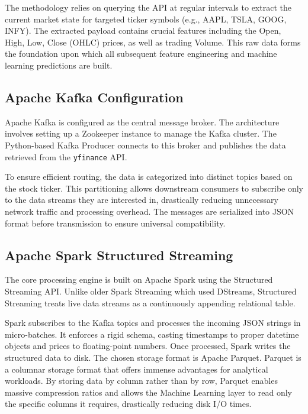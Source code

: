 \documentclass[12pt,a4paper]{report}
\begin{document}
The methodology relies on querying the API at regular intervals to extract the current market state for targeted ticker symbols (e.g., AAPL, TSLA, GOOG, INFY). The extracted payload contains crucial features including the Open, High, Low, Close (OHLC) prices, as well as trading Volume. This raw data forms the foundation upon which all subsequent feature engineering and machine learning predictions are built.

\subsection{Apache Kafka Configuration}

Apache Kafka is configured as the central message broker. The architecture involves setting up a Zookeeper instance to manage the Kafka cluster. The Python-based Kafka Producer connects to this broker and publishes the data retrieved from the \texttt{yfinance} API.

To ensure efficient routing, the data is categorized into distinct topics based on the stock ticker. This partitioning allows downstream consumers to subscribe only to the data streams they are interested in, drastically reducing unnecessary network traffic and processing overhead. The messages are serialized into JSON format before transmission to ensure universal compatibility.

\subsection{Apache Spark Structured Streaming}

The core processing engine is built on Apache Spark using the Structured Streaming API. Unlike older Spark Streaming which used DStreams, Structured Streaming treats live data streams as a continuously appending relational table.

Spark subscribes to the Kafka topics and processes the incoming JSON strings in micro-batches. It enforces a rigid schema, casting timestamps to proper datetime objects and prices to floating-point numbers. Once processed, Spark writes the structured data to disk. The chosen storage format is Apache Parquet. Parquet is a columnar storage format that offers immense advantages for analytical workloads. By storing data by column rather than by row, Parquet enables massive compression ratios and allows the Machine Learning layer to read only the specific columns it requires, drastically reducing disk I/O times.
\end{document}
